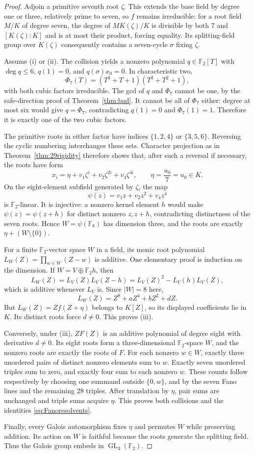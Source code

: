\documentclass[11pt,a4paper]{article}
\theoremstyle{definition}
\theoremstyle{remark}
\newcommand{\F}{\mathbb F}
\begin{document}
\begin{proof}
Adjoin a primitive seventh root $\zeta$. This extends the base field by
degree one or three, relatively prime to seven, so $f$ remains
irreducible: for a root field $M/K$ of degree seven, the degree of
$M K(\zeta)/K$ is divisible by both $7$ and $[K(\zeta):K]$ and is at most
their product, forcing equality. Its splitting-field group over
$K(\zeta)$ consequently contains a seven-cycle $\sigma$ fixing $\zeta$.

Assume (i) or (ii). The collision yields a nonzero polynomial
$q\in\F_2[T]$ with $\deg q\leq6$, $q(1)=0$, and
$q(\sigma)x_0=0$. In characteristic two,
\[
 \Phi_7(T)=(T^3+T+1)(T^3+T^2+1),
\]
with both cubic factors irreducible. The gcd of $q$ and $\Phi_7$ cannot
be one, by the safe-direction proof of Theorem~\ref{thm:bad}. It cannot
be all of $\Phi_7$ either: degree at most six would give $q=\Phi_7$,
contradicting $q(1)=0$ and $\Phi_7(1)=1$. Therefore it is exactly one of
the two cubic factors.

The primitive roots in either factor have indices
$\{1,2,4\}$ or $\{3,5,6\}$. Reversing the cyclic numbering interchanges
these sets. Character projection as in Theorem~\ref{thm:29rigidity}
therefore shows that, after such a reversal if necessary, the roots have
form
\[
 x_i=\eta+v_1\zeta^i+v_2\zeta^{2i}+v_4\zeta^{4i},
 \qquad \eta=\frac{u_0}{7}=u_0\in K.
\]
On the eight-element subfield generated by $\zeta$, the map
\[
 \psi(z)=v_1z+v_2z^2+v_4z^4
\]
is $\F_2$-linear. It is injective: a nonzero kernel element $h$ would
make $\psi(z)=\psi(z+h)$ for distinct nonzero $z,z+h$, contradicting
distinctness of the seven roots. Hence $W=\psi(\F_8)$ has dimension three,
and the roots are exactly $\eta+(W\setminus\{0\})$.

For a finite $\F_2$-vector space $W$ in a field, its monic root polynomial
$L_W(Z)=\prod_{w\in W}(Z-w)$ is additive. One elementary proof is induction
on the dimension. If $W=V\oplus\F_2 h$, then
\[
 L_W(Z)=L_V(Z)L_V(Z-h)
       =L_V(Z)^2-L_V(h)L_V(Z),
\]
which is additive whenever $L_V$ is. Since $|W|=8$ here,
\[
 L_W(Z)=Z^8+aZ^4+bZ^2+dZ.
\]
But $L_W(Z)=Zf(Z+\eta)$ belongs to $K[Z]$, so its displayed coefficients
lie in $K$. Its distinct roots force $d\neq0$. This proves (iii).

Conversely, under (iii), $ZF(Z)$ is an additive polynomial of degree eight
with derivative $d\neq0$. Its eight roots form a three-dimensional
$\F_2$-space $W$, and the nonzero roots are exactly the roots of $F$.
For each nonzero $w\in W$, exactly three unordered pairs of distinct
nonzero elements sum to $w$. Exactly seven unordered triples sum to zero,
and exactly four sum to each nonzero $w$. These counts follow respectively
by choosing one summand outside $\{0,w\}$, and by the seven Fano lines
and the remaining $28$ triples. After translation by $\eta$, pair sums
are unchanged and triple sums acquire $\eta$. This proves both collisions
and the identities \eqref{eq:Fanoresolvents}.

Finally, every Galois automorphism fixes $\eta$ and permutes $W$ while
preserving addition. Its action on $W$ is faithful because the roots
generate the splitting field. Thus the Galois group embeds in
$\operatorname{GL}_3(\F_2)$.
\end{proof}
\end{document}

